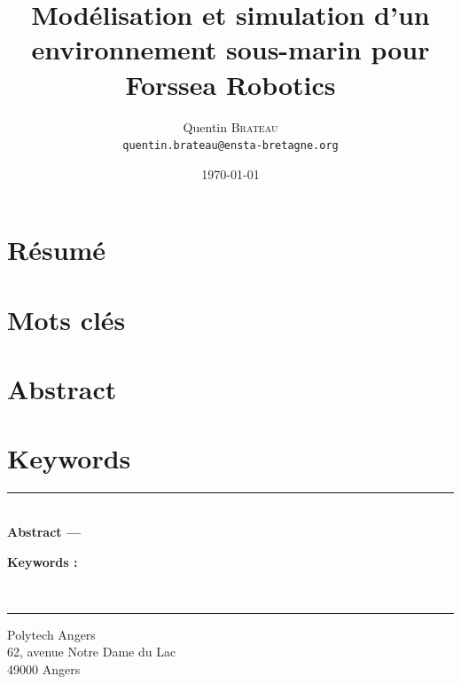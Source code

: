 \documentclass{rapport}
\title{Modélisation et simulation d'un environnement sous-marin pour Forssea Robotics}
\author{Quentin \textsc{Brateau} \\ \texttt{quentin.brateau@ensta-bretagne.org}}
\date{\today}
\begin{document}
	\frontmatter
	
	\maketitle

	\pagestyle{plain}
	\cleardoublepage

	\section*{Résumé}
	
	\section*{Mots clés}
	

	\section*{Abstract}
	
	\section*{Keywords}
	
	
	\clearpage

	\tableofcontents

	\mainmatter
	\pagestyle{fancy}
	
	
	
	
	
	
	
	
	\appendix
	\cleardoublepage
	

	\clearpage
	\label{chapter:lof}
	\listoffigures

	\clearpage
	\label{chapter:lot}
	\listoftables

	\clearpage
	\label{sec:glossaire}
	\printglossaries

	\clearpage

	
	

	\pagestyle{plain}
	\cleartoleftpage
	
	\vspace*{\fill}
	\noindent\rule[2pt]{\textwidth}{0.5pt}\\
	\textbf{Abstract ---}
	

	{\textbf{Keywords :}}
	
	\\
	\noindent\rule[2pt]{\textwidth}{0.5pt}
	\begin{center}
		Polytech Angers\\
		62, avenue Notre Dame du Lac\\
		49000 Angers
	\end{center}
	\vspace*{\fill}
\end{document}
